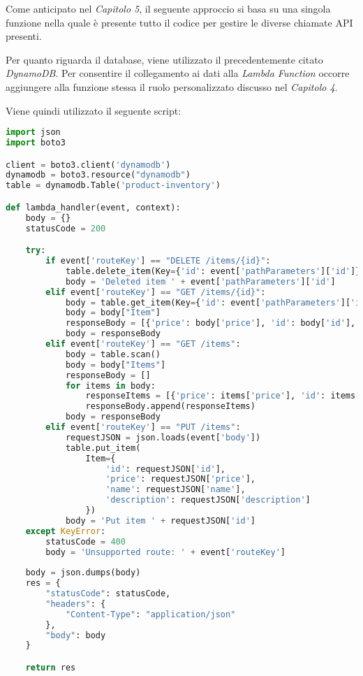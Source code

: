 Come anticipato nel \textit{Capitolo 5}, il seguente approccio si basa su una singola funzione nella quale è presente tutto il codice per gestire le diverse chiamate API presenti.

Per quanto riguarda il database, viene utilizzato il precedentemente citato \textit{DynamoDB}. Per consentire il collegamento ai dati alla \textit{Lambda Function} occorre aggiungere alla funzione stessa il ruolo personalizzato discusso nel \textit{Capitolo 4}.

Viene quindi utilizzato il seguente script:
\begin{lstlisting}[language=python]
import json
import boto3

client = boto3.client('dynamodb')
dynamodb = boto3.resource("dynamodb")
table = dynamodb.Table('product-inventory')

def lambda_handler(event, context):
    body = {}
    statusCode = 200

    try:
        if event['routeKey'] == "DELETE /items/{id}":
            table.delete_item(Key={'id': event['pathParameters']['id']})
            body = 'Deleted item ' + event['pathParameters']['id']
        elif event['routeKey'] == "GET /items/{id}":
            body = table.get_item(Key={'id': event['pathParameters']['id']})
            body = body["Item"]
            responseBody = [{'price': body['price'], 'id': body['id'], 'name': body['name'], 'description': body['description']}]
            body = responseBody
        elif event['routeKey'] == "GET /items":
            body = table.scan()
            body = body["Items"]
            responseBody = []
            for items in body:
                responseItems = [{'price': items['price'], 'id': items['id'], 'name': items['name'], 'description': items['description']}]
                responseBody.append(responseItems)
            body = responseBody
        elif event['routeKey'] == "PUT /items":
            requestJSON = json.loads(event['body'])
            table.put_item(
                Item={
                    'id': requestJSON['id'],
                    'price': requestJSON['price'],
                    'name': requestJSON['name'],
                    'description': requestJSON['description']
                })
            body = 'Put item ' + requestJSON['id']
    except KeyError:
        statusCode = 400
        body = 'Unsupported route: ' + event['routeKey']
    
    body = json.dumps(body)
    res = {
        "statusCode": statusCode,
        "headers": {
            "Content-Type": "application/json"
        },
        "body": body
    }

    return res
\end{lstlisting}

